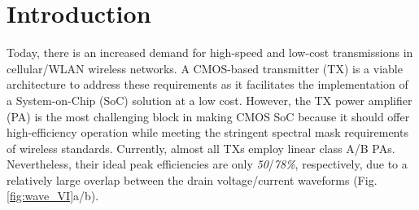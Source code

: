 \documentclass[conference]{IEEEtran}
\begin{document}
\section{Introduction}
Today, there is an increased demand for high-speed and low-cost transmissions in cellular/WLAN wireless networks. A CMOS-based transmitter (TX) is a viable architecture to address these requirements as it facilitates the implementation of a System-on-Chip (SoC) solution at a low cost. However, the TX power amplifier (PA) is the most challenging block in making CMOS SoC because it should offer high-efficiency operation while meeting the stringent spectral mask requirements of wireless standards. Currently, almost all TXs employ linear class A/B PAs. Nevertheless, their ideal  peak efficiencies are only \textit{50}/\textit{78\%}, respectively, due to a relatively large overlap between the drain voltage/current  waveforms (Fig. \ref{fig:wave_VI}a/b).
\end{document}
